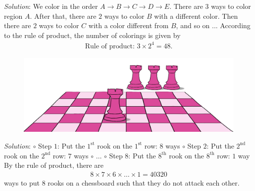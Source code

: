 \begin{multicols}{2}
\begin{center}
	\end{center}
	\textit{Solution}: We color in the order $A \to B \to C \to D \to E$. There are $3$ ways to color region $A$. After that, there are $2$ ways to color $B$ with a different color. Then there are $2$ ways to color $C$ with a color different from $B$, and so on ...
	\vskip 0.1cm   
	According to the rule of product, the number of colorings is given by
	\begin{align*}
		\text{Rule of product: } 3 \times 2^4= 48.
	\end{align*}
	\vskip 0.1cm
	\begin{figure}[H]
		\centering
		\captionsetup{labelformat= empty, justification=centering}
		\includegraphics[width=1\linewidth]{xe}
		\vspace*{-10pt}
	\end{figure}
	\textit{Solution}:
	\vskip 0.1cm 
	$\circ$ Step $1$: Put the $1^{\text{st}}$ rook on the $1^{\text{st}}$ row: $8$ ways
	\vskip 0.1cm
	$\circ$ Step $2$: Put the $2^{\text{nd}}$ rook on the $2^{\text{nd}}$ row: $7$ ways
	\vskip 0.1cm
	$\circ$ $\ldots$
	\vskip 0.1cm
	$\circ$ Step $8$: Put the $8^{\text{th}}$ rook on the $8^{\text{th}}$ row: $1$ way
	\vskip 0.1cm
	By the rule of product, there are 
	\begin{align*}
		8\times7\times6\times\ldots\times1=40320
	\end{align*}
	ways to put $8$ rooks on a chessboard such that they do not attack each other.
	\vskip 0.1cm

\end{multicols}
